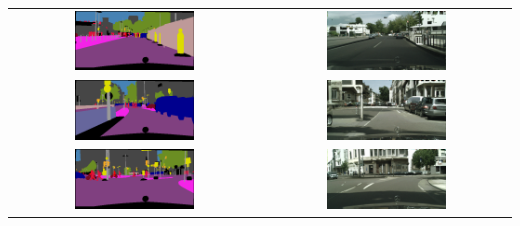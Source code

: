 \begin{longtable}{cc}
    \includegraphics[width=0.50\textwidth]{Chapters/figures/appendix/cityscapes/frankfurt_000001_005184_leftImg8bit_mask.png} &
    \includegraphics[width=0.50\textwidth]{Chapters/figures/appendix/cityscapes/frankfurt_000001_005184_leftImg8bit_sample.png} \\
    \includegraphics[width=0.50\textwidth]{Chapters/figures/appendix/cityscapes/frankfurt_000001_035144_leftImg8bit_mask.png} &
    \includegraphics[width=0.50\textwidth]{Chapters/figures/appendix/cityscapes/frankfurt_000001_035144_leftImg8bit_sample.png} \\
    \includegraphics[width=0.50\textwidth]{Chapters/figures/appendix/cityscapes/frankfurt_000001_007973_leftImg8bit_mask.png} & \includegraphics[width=0.50\textwidth]{Chapters/figures/appendix/cityscapes/frankfurt_000001_007973_leftImg8bit_sample.png} \\

\end{longtable}
